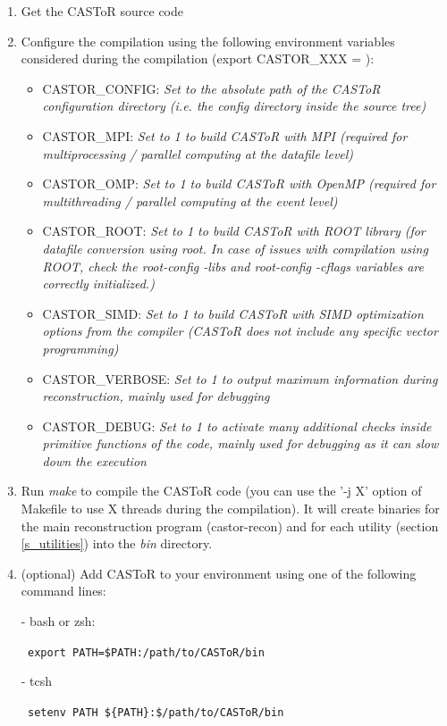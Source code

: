 \documentclass[a4paper, 11pt]{article}
\begin{document}
\begin{enumerate}
  \item Get the CASToR source code
  \item Configure the compilation using the following environment variables considered during the compilation (export CASTOR\_XXX = ):
  \begin{itemize}
    \item CASTOR\_CONFIG:  \textit{Set to the absolute path of the CASToR configuration directory (\textit{i.e.} the \textit{config} directory inside the source tree)}
    \item CASTOR\_MPI:     \textit{Set to 1 to build CASToR with MPI (required for multiprocessing / parallel computing at the datafile level)}
    \item CASTOR\_OMP:     \textit{Set to 1 to build CASToR with OpenMP (required for multithreading / parallel computing at the event level)}
    \item CASTOR\_ROOT:    \textit{Set to 1 to build CASToR with ROOT library (for datafile conversion using root. In case of issues with compilation using ROOT, check the \textit{root-config -libs} and \textit{root-config -cflags} variables are correctly initialized.)}
    \item CASTOR\_SIMD:    \textit{Set to 1 to build CASToR with SIMD optimization options from the compiler (CASToR does not include any specific vector programming)}
    \item CASTOR\_VERBOSE: \textit{Set to 1 to output maximum information during reconstruction, mainly used for debugging}
    \item CASTOR\_DEBUG:   \textit{Set to 1 to activate many additional checks inside primitive functions of the code, mainly used for debugging as it can slow down the execution}
  \end{itemize}
  \item Run \textit{make} to compile the CASToR code (you can use the '-j X' option of Makefile to use X threads during the compilation).
        It will create binaries for the main reconstruction program (castor-recon) and for each utility (section \ref{s_utilities}) into the \textit{bin} directory.
  \item (optional) Add CASToR to your environment using one of the following command lines: 

- bash or zsh:

\verb| export PATH=$PATH:/path/to/CASToR/bin|

- tcsh

\verb| setenv PATH ${PATH}:$/path/to/CASToR/bin|
\end{enumerate}
\end{document}
